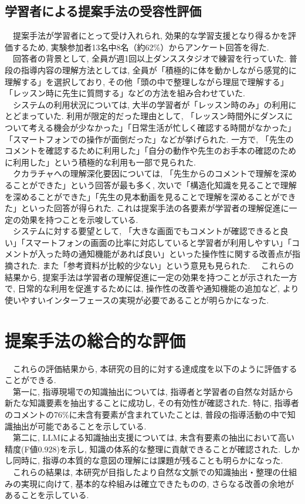 \subsection{学習者による提案手法の受容性評価}
　提案手法が学習者にとって受け入れられ, 効果的な学習支援となり得るかを評価するため, 実験参加者13名中8名（約62\%）からアンケート回答を得た. \\
　回答者の背景として, 全員が週1回以上ダンススタジオで練習を行っていた. 普段の指導内容の理解方法としては, 全員が「積極的に体を動かしながら感覚的に理解する」を選択しており, その他「頭の中で整理しながら理屈で理解する」「レッスン時に先生に質問する」などの方法を組み合わせていた. \\
　システムの利用状況については, 大半の学習者が「レッスン時のみ」の利用にとどまっていた. 利用が限定的だった理由として, 「レッスン時間外にダンスについて考える機会が少なかった」「日常生活が忙しく確認する時間がなかった」「スマートフォンでの操作が面倒だった」などが挙げられた. 一方で, 「先生のコメントを確認するために利用した」「自分の動作や先生のお手本の確認のために利用した」という積極的な利用も一部で見られた. \\
　クカラチャへの理解深化要因については, 「先生からのコメントで理解を深めることができた」という回答が最も多く, 次いで「構造化知識を見ることで理解を深めることができた」「先生の見本動画を見ることで理解を深めることができた」といった回答が得られた. これは提案手法の各要素が学習者の理解促進に一定の効果を持つことを示唆している. \\
　システムに対する要望として, 「大きな画面でもコメントが確認できると良い」「スマートフォンの画面の比率に対応していると学習者が利用しやすい」「コメントが入った時の通知機能があれば良い」といった操作性に関する改善点が指摘された. また「参考資料が比較的少ない」という意見も見られた. 
　これらの結果から, 提案手法は学習者の理解促進に一定の効果を持つことが示された一方で, 日常的な利用を促進するためには, 操作性の改善や通知機能の追加など, より使いやすいインターフェースの実現が必要であることが明らかになった. \\


\section{提案手法の総合的な評価}
　これらの評価結果から, 本研究の目的に対する達成度を以下のように評価することができる. \\
　第一に, 指導現場での知識抽出については, 指導者と学習者の自然な対話から新たな知識要素を抽出することに成功し, その有効性が確認された. 特に, 指導者のコメントの76\%に未含有要素が含まれていたことは, 普段の指導活動の中で知識抽出が可能であることを示している. \\
　第二に, LLMによる知識抽出支援については, 未含有要素の抽出において高い精度(F値0.928)を示し, 知識の体系的な整理に貢献できることが確認された. しかし同時に, 指導の本質的な意図の理解には課題が残ることも明らかになった. \\
　これらの結果は, 本研究が目指したより自然な文脈での知識抽出・整理の仕組みの実現に向けて, 基本的な枠組みは確立できたものの, さらなる改善の余地があることを示している.\\